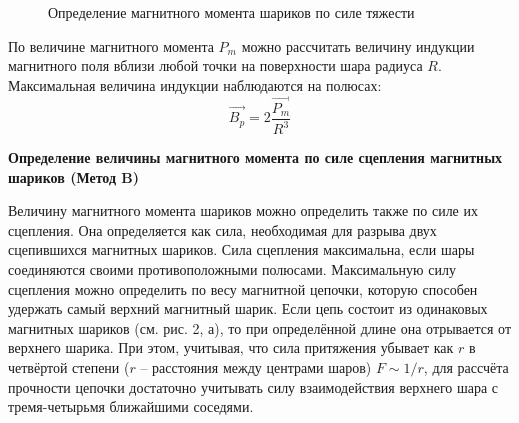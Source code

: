 \documentclass[14pt]{article}
\begin{document}
\begin{figure}[h!]
	\caption{Определение магнитного момента шариков по силе тяжести}
	\label{fig:image}
\end{figure}

По величине магнитного момента $P_m$ можно рассчитать величину индукции магнитного поля вблизи любой точки на поверхности шара радиуса $R$. Максимальная величина индукции
наблюдаются на полюсах:
$$
	\vec{B_p} = 2\frac{\vec{P_m}}{R^3}
$$

\vspace{1cm}
\textbf{Определение величины магнитного момента по силе сцепления магнитных шариков (Метод B)}

Величину магнитного момента шариков можно определить также по силе их сцепления. Она определяется как сила, необходимая для разрыва двух сцепившихся магнитных шариков. Сила сцепления максимальна, если шары соединяются своими противоположными полюсами. Максимальную силу сцепления можно определить по весу магнитной цепочки, которую способен удержать самый верхний магнитный шарик. Если цепь состоит из одинаковых магнитных шариков (см. рис. 2, а), то при определённой длине она отрывается от верхнего шарика. При этом, учитывая, что сила притяжения убывает как $r$ в четвёртой степени ($r$ -- расстояния между центрами шаров) $F \sim 1/r$, для рассчёта прочности цепочки достаточно учитывать силу взаимодействия верхнего шара с тремя-четырьмя ближайшими соседями. 
\end{document}
